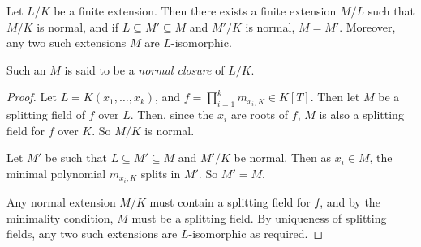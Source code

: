 \begin{corollary}
	Let \( L / K \) be a finite extension.
	Then there exists a finite extension \( M / L \) such that \( M / K \) is normal, and if \( L \subseteq M' \subseteq M \) and \( M' / K \) is normal, \( M = M' \).
	Moreover, any two such extensions \( M \) are \( L \)-isomorphic.
\end{corollary}
Such an \( M \) is said to be a \emph{normal closure} of \( L / K \).
\begin{proof}
	Let \( L = K(x_1, \dots, x_k) \), and \( f = \prod_{i=1}^k m_{x_i,K} \in K[T] \).
	Then let \( M \) be a splitting field of \( f \) over \( L \).
	Then, since the \( x_i \) are roots of \( f \), \( M \) is also a splitting field for \( f \) over \( K \).
	So \( M / K \) is normal.

	Let \( M' \) be such that \( L \subseteq M' \subseteq M \) and \( M' / K \) be normal.
	Then as \( x_i \in M \), the minimal polynomial \( m_{x_i,K} \) splits in \( M' \).
	So \( M' = M \).

	Any normal extension \( M / K \) must contain a splitting field for \( f \), and by the minimality condition, \( M \) must be a splitting field.
	By uniqueness of splitting fields, any two such extensions are \( L \)-isomorphic as required.
\end{proof}

